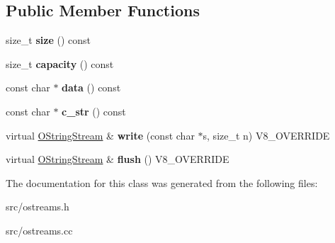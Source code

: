 \subsection*{Public Member Functions}
\begin{DoxyCompactItemize}
\item 
\hypertarget{classv8_1_1internal_1_1_o_string_stream_ae32c67968b39813d4327eb1ec038316e}{}size\+\_\+t {\bfseries size} () const \label{classv8_1_1internal_1_1_o_string_stream_ae32c67968b39813d4327eb1ec038316e}

\item 
\hypertarget{classv8_1_1internal_1_1_o_string_stream_acaa59acb2007d873065074c5e3d68073}{}size\+\_\+t {\bfseries capacity} () const \label{classv8_1_1internal_1_1_o_string_stream_acaa59acb2007d873065074c5e3d68073}

\item 
\hypertarget{classv8_1_1internal_1_1_o_string_stream_a4253415e119d498a82c0100605ddb0da}{}const char $\ast$ {\bfseries data} () const \label{classv8_1_1internal_1_1_o_string_stream_a4253415e119d498a82c0100605ddb0da}

\item 
\hypertarget{classv8_1_1internal_1_1_o_string_stream_a92e95c331e8d71c7dc7361739f207923}{}const char $\ast$ {\bfseries c\+\_\+str} () const \label{classv8_1_1internal_1_1_o_string_stream_a92e95c331e8d71c7dc7361739f207923}

\item 
\hypertarget{classv8_1_1internal_1_1_o_string_stream_a35f2792bee84389afa5e1b8fba97fd0d}{}virtual \hyperlink{classv8_1_1internal_1_1_o_string_stream}{O\+String\+Stream} \& {\bfseries write} (const char $\ast$s, size\+\_\+t n) V8\+\_\+\+O\+V\+E\+R\+R\+I\+D\+E\label{classv8_1_1internal_1_1_o_string_stream_a35f2792bee84389afa5e1b8fba97fd0d}

\item 
\hypertarget{classv8_1_1internal_1_1_o_string_stream_a8e725deba4f8bb72ec27ce8c521b290d}{}virtual \hyperlink{classv8_1_1internal_1_1_o_string_stream}{O\+String\+Stream} \& {\bfseries flush} () V8\+\_\+\+O\+V\+E\+R\+R\+I\+D\+E\label{classv8_1_1internal_1_1_o_string_stream_a8e725deba4f8bb72ec27ce8c521b290d}

\end{DoxyCompactItemize}


The documentation for this class was generated from the following files\+:\begin{DoxyCompactItemize}
\item 
src/ostreams.\+h\item 
src/ostreams.\+cc\end{DoxyCompactItemize}
